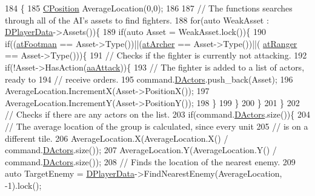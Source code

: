 \begin{DoxyCode}
184                                                            \{
185     \hyperlink{classCPosition}{CPosition} AverageLocation(0,0);
186     
187     \textcolor{comment}{// The functions searches through all of the AI's assets to find fighters.}
188     \textcolor{keywordflow}{for}(\textcolor{keyword}{auto} WeakAsset : \hyperlink{classCAIPlayer_a83b5113c8f7e80df54940b647c5ee2e6}{DPlayerData}->Assets())\{
189         \textcolor{keywordflow}{if}(\textcolor{keyword}{auto} Asset = WeakAsset.lock())\{
190             \textcolor{keywordflow}{if}((\hyperlink{GameDataTypes_8h_a5600d4fc433b83300308921974477fecad586e8ff9ee846d22630c2066e8fb7c2}{atFootman} == Asset->Type())||(\hyperlink{GameDataTypes_8h_a5600d4fc433b83300308921974477feca7fad0074234068ff0af4092a75b929f8}{atArcher} == Asset->Type())||(
      \hyperlink{GameDataTypes_8h_a5600d4fc433b83300308921974477fecaafd2b1e0ca34872bb06098dbec9939e0}{atRanger} == Asset->Type()))\{
191                 \textcolor{comment}{// Checks if the fighter is currently not attacking.}
192                 \textcolor{keywordflow}{if}(!Asset->HasAction(\hyperlink{GameDataTypes_8h_ab47668e651a3032cfb9c40ea2d60d670a948eefd20b9e43d3b4cfcf613774716d}{aaAttack}))\{
193                     \textcolor{comment}{// The fighter is added to a list of actors, ready to}
194                     \textcolor{comment}{// receive orders.}
195                     command.\hyperlink{structSPlayerCommandRequest_aa37fc01519676345703d78b9f573894a}{DActors}.push\_back(Asset);
196                     AverageLocation.IncrementX(Asset->PositionX());
197                     AverageLocation.IncrementY(Asset->PositionY());
198                 \}
199             \}
200         \}
201     \}
202     \textcolor{comment}{// Checks if there are any actors on the list.}
203     \textcolor{keywordflow}{if}(command.\hyperlink{structSPlayerCommandRequest_aa37fc01519676345703d78b9f573894a}{DActors}.size())\{
204         \textcolor{comment}{// The average location of the group is calculated, since every unit}
205         \textcolor{comment}{// is on a different tile. }
206         AverageLocation.X(AverageLocation.X() / command.\hyperlink{structSPlayerCommandRequest_aa37fc01519676345703d78b9f573894a}{DActors}.size());
207         AverageLocation.Y(AverageLocation.Y() / command.\hyperlink{structSPlayerCommandRequest_aa37fc01519676345703d78b9f573894a}{DActors}.size());
208         \textcolor{comment}{// Finds the location of the nearest enemy.}
209         \textcolor{keyword}{auto} TargetEnemy = \hyperlink{classCAIPlayer_a83b5113c8f7e80df54940b647c5ee2e6}{DPlayerData}->FindNearestEnemy(AverageLocation, -1).lock();

\end{DoxyCode}
